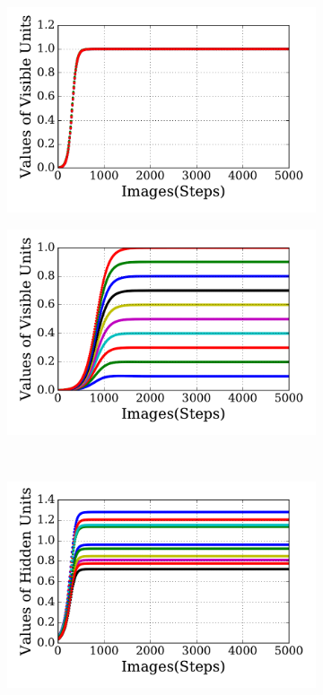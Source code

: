 \begin{figure}
\begin{subfigure}[t]{0.48\textwidth}
		\includegraphics[width=\textwidth]{pics_sdlm/20_exp_AE/exp1_recon_non.pdf}
		\caption{}
	\end{subfigure}
	\begin{subfigure}[t]{0.48\textwidth}
		\includegraphics[width=\textwidth]{pics_sdlm/20_exp_AE/exp2_recon_non.pdf}
		\caption{}
	\end{subfigure}\\
	\begin{subfigure}[t]{0.48\textwidth}
		\includegraphics[width=\textwidth]{pics_sdlm/20_exp_AE/exp1_hid_non.pdf}

\end{subfigure}
\end{figure}
